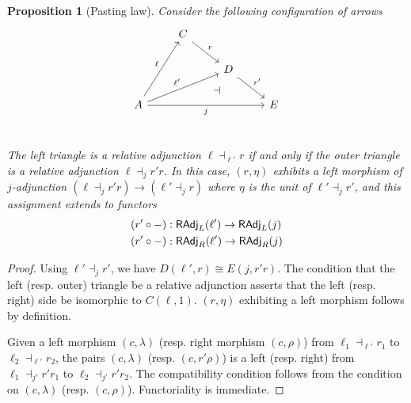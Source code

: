 \documentclass[10pt,a4paper]{article}
\newcommand{\cat}[1]{\textcat{#1}}
\newcommand{\textcat}[1]{{\normalfont\textsf{#1}}}
\newcommand{\simeqq}{\cong}
\theoremstyle{plain}
\newtheorem{proposition}[theorem]{Proposition}
\theoremstyle{definition}
\theoremstyle{remark}
\begin{document}
\begin{proposition}[Pasting law]
    \label{prop:radj_pasting}
    Consider the following configuration of arrows
    \[\begin{tikzcd}
        &C \ar[dr, "r"] &&\\
        && \ar[dr, "r'", ""{anchor=center,name=r_}] D &\\
        A \ar[uur, "\ell"] \ar[urr, "\ell'", ""{anchor=center,name=l_}] \ar[rrr, "j"'] &&& E\\
        \ar[from=l_, to=r_, phantom, "\dashv", shift right]
    \end{tikzcd}\]
    The left triangle is a relative adjunction $\ell\dashv_{\ell'}r$ if and only if the outer triangle is a relative adjunction $\ell\dashv_jr'r$. In this case, $(r, \eta)$ exhibits a left morphism of $j$-adjunction $(\ell\dashv_jr'r) \to (\ell'\dashv_jr)$ where $\eta$ is the unit of $\ell'\dashv_jr'$, and this assignment extends to functors
    \begin{align*}
        (r'\circ-) &: \cat{RAdj}_L(\ell') \to \cat{RAdj}_L(j)\\
        (r'\circ-) &: \cat{RAdj}_R(\ell') \to \cat{RAdj}_R(j)
    \end{align*}
\end{proposition}

\begin{proof}
    Using $\ell'\dashv_jr'$, we have $D(\ell', r) \simeqq E(j, r'r)$. The condition that the left (resp. outer) triangle be a relative adjunction asserts that the left (resp. right) side be isomorphic to $C(\ell, 1)$. $(r, \eta)$ exhibiting a left morphism follows by definition.

    Given a left morphism $(c, \lambda)$ (resp. right morphism $(c, \rho)$) from $\ell_1\dashv_{\ell'}r_1$ to $\ell_2\dashv_{\ell'}r_2$, the pairs $(c, \lambda)$ (resp. $(c, r'\rho)$) is a left (resp. right) from $\ell_1\dashv_{j'}r'r_1$ to $\ell_2\dashv_{j'}r'r_2$. The compatibility condition follows from the condition on $(c, \lambda)$ (resp. $(c, \rho)$). Functoriality is immediate.
\end{proof}
\end{document}
